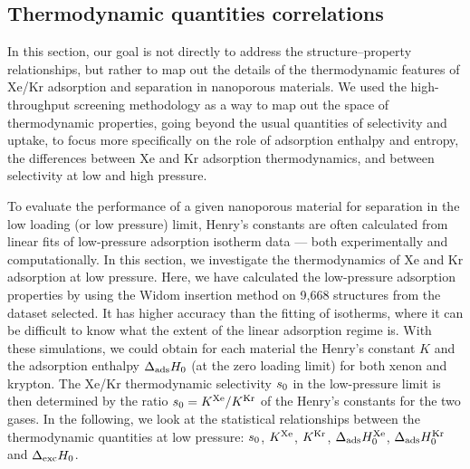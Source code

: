 \documentclass[main.tex]{subfiles}
\begin{document}
\subsection{Thermodynamic quantities correlations}

In this section, our goal is not directly to address the structure--property relationships, but rather to map out the details of the thermodynamic features of Xe/Kr adsorption and separation in nanoporous materials. We used the high-throughput screening methodology as a way to map out the space of thermodynamic properties, going beyond the usual quantities of selectivity and uptake, to focus more specifically on the role of adsorption enthalpy and entropy, the differences between Xe and Kr adsorption thermodynamics, and between selectivity at low and high pressure.

To evaluate the performance of a given nanoporous material for separation in the low loading (or low pressure) limit, Henry's constants are often calculated from linear fits of low-pressure adsorption isotherm data --- both experimentally and computationally. In this section, we investigate the thermodynamics of Xe and Kr adsorption at low pressure. Here, we have calculated the low-pressure adsorption properties by using the Widom insertion method\cite{Widom1963, frenkel2001widom} on 9,668 structures from the dataset selected. It has higher accuracy than the fitting of isotherms, where it can be difficult to know what the extent of the linear adsorption regime is. With these simulations, we could obtain for each material the Henry's constant $K$ and the adsorption enthalpy $\Delta_{\text{ads}}H_{\text{0}}$ (at the zero loading limit) for both xenon and krypton. The Xe/Kr thermodynamic selectivity $s_{\text{0}}$ in the low-pressure limit is then determined by the ratio $s_{\text{0}} = K^{\text{Xe}}/K^{\text{Kr}}$ of the Henry's constants for the two gases. In the following, we look at the statistical relationships between the thermodynamic quantities at low pressure: $s_{\text{0}}$, $K^{\text{Xe}}$, $K^{\text{Kr}}$, $\Delta_{\text{ads}}H_{\text{0}}^{\text{Xe}}$, $\Delta_{\text{ads}}H_{\text{0}}^{\text{Kr}}$ and $\Delta_{\text{exc}}H_{\text{0}}$.
\end{document}
